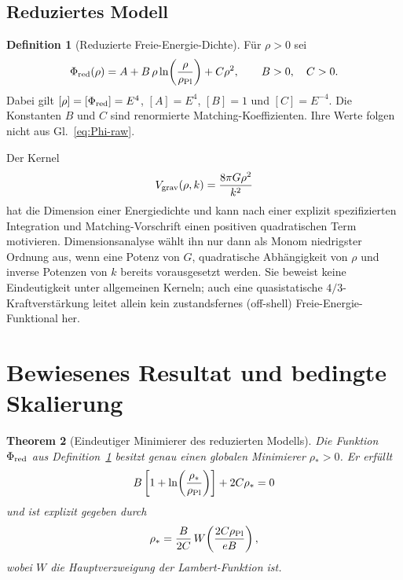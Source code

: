 \documentclass[12pt,a4paper]{article}
\theoremstyle{definition}
\newtheorem{definition}{Definition}[section]
\theoremstyle{plain}
\newtheorem{theorem}[definition]{Theorem}
\theoremstyle{remark}
\begin{document}
\subsection{Reduziertes Modell}

\begin{definition}[Reduzierte Freie-Energie-Dichte]\label{def:functional}
Für \(\rho>0\) sei
\begin{equation}\label{eq:Phi}
 \Phi_{\rm red}(\rho)
 =A+B\,\rho\ln\!\left(\frac{\rho}{\rho_{\rm Pl}}\right)+C\rho^2 ,
 \qquad B>0,\quad C>0 .
\end{equation}
Dabei gilt
\([\rho]=[\Phi_{\rm red}]=E^4\), \([A]=E^4\), \([B]=1\) und
\([C]=E^{-4}\). Die Konstanten \(B\) und \(C\) sind renormierte
Matching-Koeffizienten. Ihre Werte folgen nicht aus
Gl.~\eqref{eq:Phi-raw}.
\end{definition}

Der Kernel
\begin{equation}\label{eq:Vgrav}
 V_{\rm grav}(\rho,k)=\frac{8\pi G\rho^2}{k^2}
\end{equation}
hat die Dimension einer Energiedichte und kann nach einer explizit
spezifizierten Integration und Matching-Vorschrift einen positiven
quadratischen Term motivieren. Dimensionsanalyse wählt ihn nur dann als
Monom niedrigster Ordnung aus, wenn eine Potenz von \(G\), quadratische
Abhängigkeit von \(\rho\) und inverse Potenzen von \(k\) bereits vorausgesetzt
werden. Sie beweist keine Eindeutigkeit unter allgemeinen Kerneln; auch eine
quasistatische \(4/3\)-Kraftverstärkung leitet allein kein zustandsfernes (off-shell)
Freie-Energie-Funktional her.

\section{Bewiesenes Resultat und bedingte Skalierung}\label{sec:main}

\begin{theorem}[Eindeutiger Minimierer des reduzierten Modells]\label{thm:main}
Die Funktion \(\Phi_{\rm red}\) aus Definition~\ref{def:functional} besitzt
genau einen globalen Minimierer \(\rho_\ast>0\). Er erfüllt
\begin{equation}\label{eq:stationarity}
 B\left[1+\ln\!\left(\frac{\rho_\ast}{\rho_{\rm Pl}}\right)\right]
 +2C\rho_\ast=0
\end{equation}
und ist explizit gegeben durch
\begin{equation}\label{eq:rho-lambert}
 \rho_\ast=\frac{B}{2C}\,
 W\!\left(\frac{2C\rho_{\rm Pl}}{eB}\right),
\end{equation}
wobei \(W\) die Hauptverzweigung der Lambert-Funktion ist.
\end{theorem}
\end{document}
